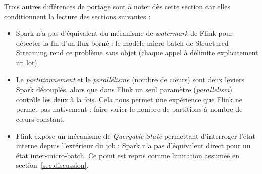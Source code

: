 Trois autres différences de portage sont à noter dès cette section car
elles conditionnent la lecture des sections suivantes :
\begin{itemize}
  \item Spark n'a pas d'équivalent du mécanisme de \emph{watermark} de Flink
        pour détecter la fin d'un flux borné : le modèle micro-batch de
        Structured Streaming rend ce problème sans objet (chaque appel à
         délimite explicitement un lot).
  \item Le \emph{partitionnement} et le \emph{parallélisme} (nombre de
        cœurs) sont deux leviers Spark découplés, alors que dans Flink un
        seul paramètre (\emph{parallelism}) contrôle les deux à la fois.
        Cela nous permet une expérience que Flink ne permet pas
        nativement : faire varier le nombre de partitions à nombre de
        cœurs constant.
  \item Flink expose un mécanisme de \emph{Queryable State} permettant
        d'interroger l'état interne depuis l'extérieur du job ; Spark n'a
        pas d'équivalent direct pour un état inter-micro-batch. Ce point est
        repris comme limitation assumée en section~\ref{sec:discussion}.
\end{itemize}
